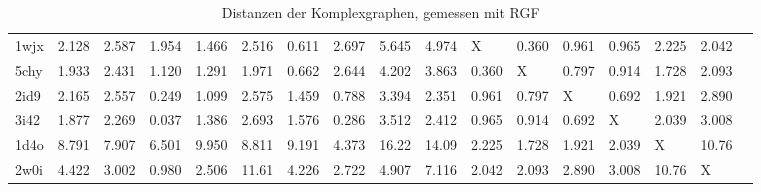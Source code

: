\documentclass{report}
\begin{document}
\begin{table}
{\begin{tabular}{l l l l l l l l l l l l l l l l l}
1wjx & 2.128 & 2.587 & 1.954 & 1.466 & 2.516 & \cellcolor{fGreen!75}0.611 & 2.697 & 5.645 & 4.974 &   X   & \cellcolor{fGreen!100}0.360 & \cellcolor{fGreen!50}0.961 & \cellcolor{fGreen!25}0.965 & 2.225 & 2.042 &  \\
5chy & 1.933 & 2.431 & 1.120 & 1.291 & 1.971 & \cellcolor{fGreen!75}0.662 & 2.644 & 4.202 & 3.863 & \cellcolor{fGreen!100}0.360 &   X   & \cellcolor{fGreen!50}0.797 & \cellcolor{fGreen!25}0.914 & 1.728 & 2.093 &  \\
2id9 & 2.165 & 2.557 & \cellcolor{fGreen!100}0.249 & 1.099 & 2.575 & 1.459 & \cellcolor{fGreen!50}0.788 & 3.394 & 2.351 & 0.961 & \cellcolor{fGreen!25}0.797 &   X   & \cellcolor{fGreen!75}0.692 & 1.921 & 2.890 &  \\
3i42 & 1.877 & 2.269 & \cellcolor{fGreen!100}0.037 & 1.386 & 2.693 & 1.576 & \cellcolor{fGreen!75}0.286 & 3.512 & 2.412 & 0.965 & \cellcolor{fGreen!25}0.914 & \cellcolor{fGreen!50}0.692 &   X   & 2.039 & 3.008 &  \\
1d4o & 8.791 & 7.907 & 6.501 & 9.950 & 8.811 & 9.191 & 4.373 & 16.22 & 14.09 & \cellcolor{fGreen!25}2.225 & \cellcolor{fGreen!100}1.728 & \cellcolor{fGreen!75}1.921 & \cellcolor{fGreen!50}2.039 &   X   & 10.76 &  \\
2w0i & 4.422 & 3.002 & \cellcolor{fGreen!100}0.980 & \cellcolor{fGreen!25}2.506 & 11.61 & 4.226 & 2.722 & 4.907 & 7.116 & \cellcolor{fGreen!75}2.042 & \cellcolor{fGreen!50}2.093 & 2.890 & 3.008 & 10.76 &   X   &  \\



\end{tabular}}
\caption{Distanzen der Komplexgraphen, gemessen mit RGF}
\end{table}


\newpage
\end{document}
